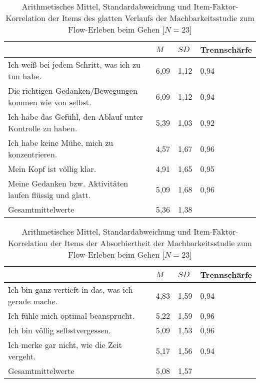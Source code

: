 \begin{table}
	[!htb] \centering \caption[Item-Faktor-Korrelation der Items des glatten Verlaufs (Machbarkeitsstudie: Gehen)]{Arithmetisches Mittel, Standardabweichung und Item-Faktor-Korrelation der Items des glatten Verlaufs der Machbarkeitsstudie zum Flow-Erleben beim Gehen [$N = 23$]} \label{tab:glatter_verlauf_2} 
	\begin{tabularx}
		{ 
		\textwidth}{p{} p{} p{} p{}} \toprule & $M$ & $SD$ & Trennschärfe \\
		\midrule Ich weiß bei jedem Schritt, was ich zu tun habe. & 6,09 & 1,12 & 0,94 \\
		Die richtigen Gedanken/Bewegungen kommen wie von selbst. & 6,09 & 1,12 & 0,94 \\
		Ich habe das Gefühl, den Ablauf unter Kontrolle zu haben. & 5,39 & 1,03 & 0,92 \\
		Ich habe keine Mühe, mich zu konzentrieren. & 4,57 & 1,67 & 0,96 \\
		Mein Kopf ist völlig klar. & 4,91 & 1,65 & 0,95 \\
		Meine Gedanken bzw. Aktivitäten laufen flüssig und glatt. & 5,09 & 1,68 & 0,96 \\
		Gesamtmittelwerte & 5,36 & 1,38 & \\
		\bottomrule 
	\end{tabularx}
\end{table}
\begin{table}
	[!htb] \centering \caption[Item-Faktor-Korrelation der Items der Absorbiertheit (Machbarkeitsstudie: Gehen)]{Arithmetisches Mittel, Standardabweichung und Item-Faktor-Korrelation der Items der Absorbiertheit der Machbarkeitsstudie zum Flow-Erleben beim Gehen [$N = 23$]} \label{tab:absorbiertheit_2} 
	\begin{tabularx}
		{ 
		\textwidth}{p{} p{} p{} p{}} \toprule & $M$ & $SD$ & Trennschärfe \\
		\midrule Ich bin ganz vertieft in das, was ich gerade mache. & 4,83 & 1,59 & 0,94 \\
		Ich fühle mich optimal beansprucht. & 5,22 & 1,59 & 0,96 \\
		Ich bin völlig selbstvergessen. & 5,09 & 1,53 & 0,96 \\
		Ich merke gar nicht, wie die Zeit vergeht. & 5,17 & 1,56 & 0,94 \\
		Gesamtmittelwerte & 5,08 & 1,57 & \\
		\bottomrule 
	\end{tabularx}
\end{table}

